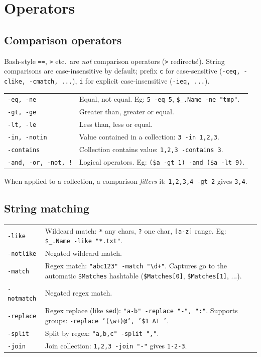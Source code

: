 \section{Operators}

\subsection{Comparison operators}

Bash-style \texttt{==}, \texttt{>} etc.\ are \emph{not} comparison operators (\texttt{>} redirects!). String comparisons are case-insensitive by default; prefix \texttt{c} for case-sensitive (\texttt{-ceq, -clike, -cmatch, ...}), \texttt{i} for explicit case-insensitive (\texttt{-ieq, ...}).\\

\begin{tabularx}{\linewidth}{lX}
    \texttt{-eq, -ne} & Equal, not equal. Eg: \texttt{5 -eq 5}, \texttt{\$\_.Name -ne "tmp"}.\\
    \texttt{-gt, -ge} & Greater than, greater or equal.\\
    \texttt{-lt, -le} & Less than, less or equal.\\
    \texttt{-in, -notin} & Value contained in a collection: \texttt{3 -in 1,2,3}.\\
    \texttt{-contains} & Collection contains value: \texttt{1,2,3 -contains 3}.\\
    \texttt{-and, -or, -not, !} & Logical operators. Eg: \texttt{(\$a -gt 1) -and (\$a -lt 9)}.\\
    \hline
\end{tabularx}

When applied to a collection, a comparison \emph{filters} it: \texttt{1,2,3,4 -gt 2} gives \texttt{3,4}.

\subsection{String matching}

\begin{tabularx}{\linewidth}{lX}
    \texttt{-like} & Wildcard match: \texttt{*} any chars, \texttt{?} one char, \texttt{[a-z]} range. Eg: \texttt{\$\_.Name -like "*.txt"}.\\
    \texttt{-notlike} & Negated wildcard match.\\
    \texttt{-match} & Regex match: \texttt{"abc123" -match "\textbackslash d+"}. Captures go to the automatic \texttt{\$Matches} hashtable (\texttt{\$Matches[0]}, \texttt{\$Matches[1]}, ...).\\
    \texttt{-notmatch} & Negated regex match.\\
    \texttt{-replace} & Regex replace (like \texttt{sed}): \texttt{"a-b" -replace "-", ":"}. Supports groups: \texttt{-replace '(\textbackslash w+)@', '\$1 AT '}.\\
    \texttt{-split} & Split by regex: \texttt{"a,b,c" -split ","}.\\
    \texttt{-join} & Join collection: \texttt{1,2,3 -join "-"} gives \texttt{1-2-3}.\\
    \hline
\end{tabularx}
